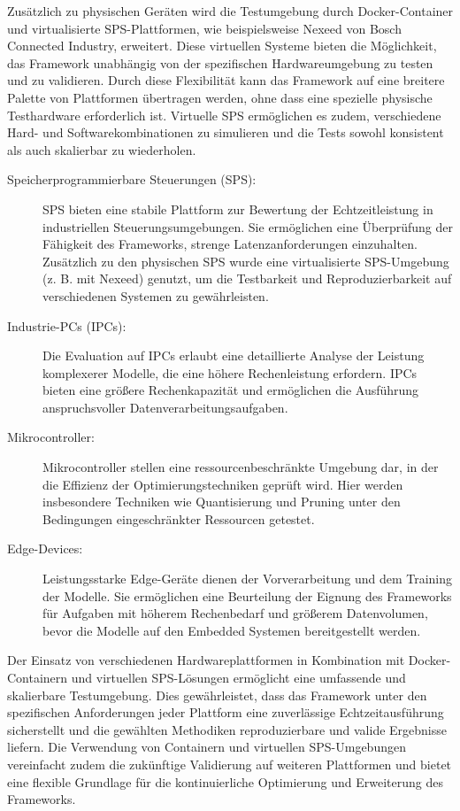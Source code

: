 Zusätzlich zu physischen Geräten wird die Testumgebung durch Docker-Container und virtualisierte SPS-Plattformen, 
wie beispielsweise Nexeed von Bosch Connected Industry, erweitert. Diese virtuellen Systeme bieten die Möglichkeit, 
das Framework unabhängig von der spezifischen Hardwareumgebung zu testen und zu validieren. 
Durch diese Flexibilität kann das Framework auf eine breitere Palette von Plattformen übertragen werden, 
ohne dass eine spezielle physische Testhardware erforderlich ist. Virtuelle SPS ermöglichen es zudem, 
verschiedene Hard- und Softwarekombinationen zu simulieren und die Tests sowohl konsistent als auch skalierbar zu wiederholen.

\begin{description}
    \item[Speicherprogrammierbare Steuerungen (SPS):] SPS bieten eine stabile Plattform zur Bewertung der Echtzeitleistung in industriellen Steuerungsumgebungen. 
    Sie ermöglichen eine Überprüfung der Fähigkeit des Frameworks, strenge Latenzanforderungen einzuhalten. Zusätzlich zu den physischen SPS 
    wurde eine virtualisierte SPS-Umgebung (z. B. mit Nexeed) genutzt, um die Testbarkeit und Reproduzierbarkeit auf verschiedenen Systemen zu gewährleisten.    
    \item[Industrie-PCs (IPCs):] Die Evaluation auf IPCs erlaubt eine detaillierte Analyse der Leistung komplexerer Modelle, die eine höhere Rechenleistung erfordern. 
    IPCs bieten eine größere Rechenkapazität und ermöglichen die Ausführung anspruchsvoller Datenverarbeitungsaufgaben.
    
    \item[Mikrocontroller:] Mikrocontroller stellen eine ressourcenbeschränkte Umgebung dar, in der die Effizienz der Optimierungstechniken geprüft wird. 
    Hier werden insbesondere Techniken wie Quantisierung und Pruning unter den Bedingungen eingeschränkter Ressourcen getestet.
    
    \item[Edge-Devices:] Leistungsstarke Edge-Geräte dienen der Vorverarbeitung und dem Training der Modelle. Sie ermöglichen eine Beurteilung der Eignung des 
    Frameworks für Aufgaben mit höherem Rechenbedarf und größerem Datenvolumen, bevor die Modelle auf den Embedded Systemen bereitgestellt werden.
\end{description}

Der Einsatz von verschiedenen Hardwareplattformen in Kombination mit Docker-Containern und virtuellen SPS-Lösungen ermöglicht eine umfassende und skalierbare Testumgebung. 
Dies gewährleistet, dass das Framework unter den spezifischen Anforderungen jeder Plattform eine zuverlässige Echtzeitausführung sicherstellt und die gewählten Methodiken 
reproduzierbare und valide Ergebnisse liefern. Die Verwendung von Containern und virtuellen SPS-Umgebungen vereinfacht zudem die zukünftige Validierung auf weiteren Plattformen 
und bietet eine flexible Grundlage für die kontinuierliche Optimierung und Erweiterung des Frameworks.
